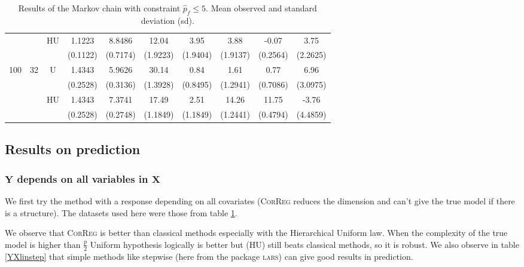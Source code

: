 \documentclass[11pt,a4paper]{article}
\begin{document}
\begin{table}[h!]
\begin{tabular}{|c|c|c|c|c|c|c|c|c|c|}
 &  &HU & 1.1223 & 8.8486 & 12.04 & 3.95 & 3.88 & -0.07 & 3.75  \\
& & & (0.1122) & (0.7174) & (1.9223) & (1.9404) & (1.9137) & (0.2564) & (2.2625) \\
\hline %
100 & 32 & U& 1.4343 & 5.9626 & 30.14 & 0.84 & 1.61 & 0.77 & 6.96  \\
& & & (0.2528) & (0.3136) & (1.3928) & (0.8495) & (1.2941) & (0.7086) & (3.0975) \\
 &  &HU & 1.4343 & 7.3741 & 17.49 & 2.51 & 14.26 & 11.75 & -3.76  \\
& & & (0.2528) & (0.2748) & (1.1849) & (1.1849) & (1.2441) & (0.4794) & (4.4859) \\
\hline
\end{tabular} 
\caption{Results of the Markov chain with  constraint $\hat{p}_f\leq 5$. Mean observed and standard deviation (sd). } \label{compZvrai}
\end{table}


\clearpage
\subsection{Results on prediction}
	\subsubsection{$\boldsymbol{Y}$ depends on all variables in $\boldsymbol{X}$}	 \label{tableMSEsimtout}	
We first try the method with a response depending on all covariates (\textsc{CorReg} reduces the dimension and can't give the true model if there is a structure). The datasets used here were those from table \ref{compZvrai}.

We observe that \textsc{CorReg} is better than classical methods especially with the Hierarchical Uniform law. When the complexity of the true model is higher than $\frac{p}{2}$ Uniform hypothesis logically is better but (HU) still beats classical methods, so it is robust. We also observe in table \ref{YXlinstep} that simple methods like stepwise (here from the package \textsc{lars}) can give good results in prediction.
\end{document}
